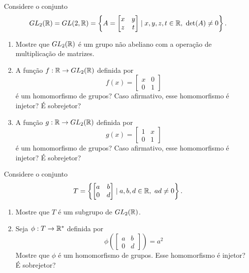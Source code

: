 \documentclass[12pt]{exam}
\begin{document}
    \vspace{.3cm}

    \questao{} Considere o conjunto
    \[
        GL_2(\mathbb{R}) = GL(2, \mathbb{R}) = \left\{A = \begin{bmatrix}x & y\\z & t\end{bmatrix} \mid x, y, z, t \in \mathbb{R},\ \det(A) \ne 0 \right\}.
    \]
    \begin{enumerate}[label=({\alph*})]
        \item Mostre que $GL_2(\mathbb{R})$ é um grupo não abeliano com a operação de multiplicação de matrizes.

        \item A função $f : \mathbb{R} \to GL_2(\mathbb{R})$ definida por
            \[
                f(x) = \begin{bmatrix}x & 0\\0 & 1\end{bmatrix}
            \]
        é um homomorfismo de grupos? Caso afirmativo, esse homomorfismo é injetor? É sobrejetor?

        \item A função $g : \mathbb{R} \to GL_2(\mathbb{R})$ definida por
            \[
                g(x) = \begin{bmatrix}1 & x\\0 & 1\end{bmatrix}
            \]
        é um homomorfismo de grupos? Caso afirmativo, esse homomorfismo é injetor? É sobrejetor?
    \end{enumerate}

    \vspace{.3cm}

    \questao{} Considere o conjunto
    \[
        T = \left\{\begin{bmatrix}a & b\\0 & d\end{bmatrix} \mid a, b, d \in \mathbb{R},\ ad \ne 0 \right\}.
    \]
    \begin{enumerate}[label=({\alph*})]
        \item Mostre que $T$ é um subgrupo de $GL_2(\mathbb{R})$.

        \item Seja $\phi : T \to \mathbb{R}^*$ definida por
            \[
                \phi\left(\begin{bmatrix}a & b\\0 & d\end{bmatrix}\right) = a^2
            \]
            Mostre que $\phi$ é um homomorfismo de grupos. Esse homomorfismo é injetor? É sobrejetor?
    \end{enumerate}
\end{document}
